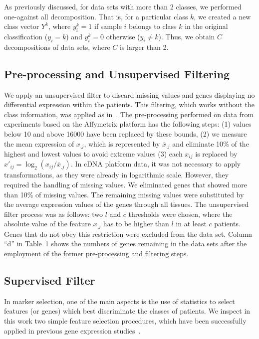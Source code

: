 \documentclass[10pt]{bmc_article}
\newenvironment{bmcformat}{\begin{raggedright}\baselineskip20pt\sloppy\setboolean{publ}{false}}{\end{raggedright}\baselineskip20pt\sloppy}
\begin{document}
\begin{bmcformat}
As previously discussed, for data sets with more than 2 classes, we
performed one-against all decomposition.  That is, for a particular
class $k$, we created a new class vector $Y^k$, where $y^k_i=1$ if
sample $i$ belongs to class $k$ in the original classification
($y_i=k$) and $y^k_i=0$ otherwise ($y_i\neq k$). Thus, we obtain $C$
decompositions of data sets, where $C$ is larger than 2.


\subsection*{Pre-processing and Unsupervised Filtering}

We apply an unsupervised filter to discard missing values and genes
displaying no differential expression within the patients. This
filtering, which works without the class information, was applied as
in~\cite{Souto2008}.  The pre-processing performed on data from
experiments based on the Affymetrix platform has the following steps:
(1) values below 10 and above 16000 have been replaced by these
bounds, (2) we measure the mean expression of $x_{.j}$, which is
represented by $\overline{x}_{.j}$ and eliminate 10$\%$ of the highest
and lowest values to avoid extreme values (3) each $x_{ij}$ is
replaced by $x\prime_{ij} = \log_2 (x_{ij}/\overline{x}_{.j})$. In
cDNA platform data, it was not necessary to apply transformations, as
they were already in logarithmic scale. However, they required the
handling of missing values. We eliminated genes that showed more than
10$\%$ of missing values. The remaining missing values were
substituted by the average expression values of the genes through all
tissues. The unsupervised filter process was as follows: two $l$ and
$c$ thresholds were chosen, where the absolute value of the feature
$x_{.j}$ has to be higher than $l$ in at least $c$ patients. Genes
that do not obey this restriction were excluded from the data
set. Column ``d'' in Table~1 shows the numbers of genes remaining in
the data sets after the employment of the former pre-processing and
filtering steps.

\subsection*{Supervised Filter}

In marker selection, one of the main aspects is the use of statistics
to select features (or genes) which best discriminate the classes of
patients. We inspect in this work two simple feature selection
procedures, which have been successfully applied in previous gene expression
studies~\cite{Dudoit2002}.


\end{bmcformat}
\end{document}
